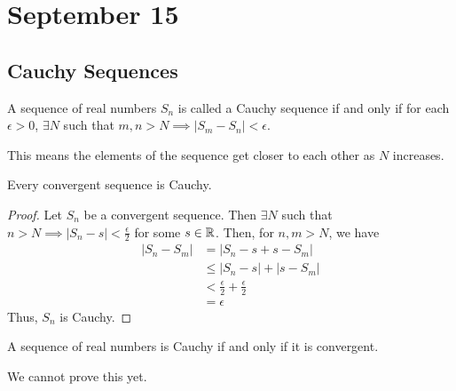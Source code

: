 \section{September 15}

\subsection{Cauchy Sequences}
\begin{definition}
    A sequence of real numbers $S_n$ is called a Cauchy sequence if and only if for each $\epsilon > 0$, $\exists N$ such that $m, n > N \implies |S_m - S_n| < \epsilon$.
\end{definition}
\begin{remark}
    This means the elements of the sequence get closer to each other as $N$ increases.
\end{remark}

\begin{theorem}
    Every convergent sequence is Cauchy.
\end{theorem}
\begin{proof}
    Let $S_n$ be a convergent sequence. Then $\exists N$ such that $n > N \implies |S_n - s| < \frac{\epsilon}{2}$ for some $s \in \mathbb{R}$. Then, for $n, m > N$, we have
    \begin{align*}
        |S_n - S_m| &= |S_n - s + s - S_m| \\
        &\leq |S_n - s| + |s - S_m| \\
        &< \frac{\epsilon}{2} + \frac{\epsilon}{2} \\
        &= \epsilon
    \end{align*}
    Thus, $S_n$ is Cauchy.
\end{proof}

\begin{theorem}
    A sequence of real numbers is Cauchy if and only if it is convergent.
\end{theorem}
\begin{remark}
    We cannot prove this yet.
\end{remark}